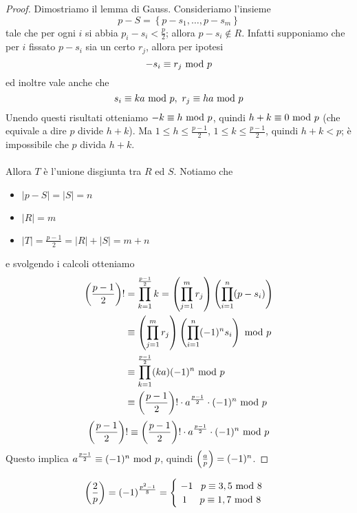 \begin{proof}
	Dimostriamo il lemma di Gauss. Consideriamo l'insieme
	\begin{equation*}
	p-S=\left\{p-s_1,\dots,p-s_m\right\}
	\end{equation*}
	tale che per ogni $i$ si abbia $p_i-s_i<\frac{p}{2}$; allora $p-s_i\notin R$. Infatti supponiamo che per $i$ fissato $p-s_i$ sia un certo $r_j$, allora per ipotesi
	\begin{equation*}
	-s_i\equiv r_j\ \mathrm{mod}\ p
	\end{equation*}
	ed inoltre vale anche che 
	\begin{equation*}
	s_i\equiv ka\ \mathrm{mod}\ p, \ r_j\equiv ha\ \mathrm{mod}\ p
	\end{equation*}
	Unendo questi risultati otteniamo $-k\equiv h\ \mathrm{mod}\ p$, quindi $h+k\equiv0\ \mathrm{mod}\ p$ (che equivale a dire $p$ divide $h+k$). Ma $1\leq h\leq\frac{p-1}{2}$, $1\leq k\leq\frac{p-1}{2}$, quindi $h+k<p$; è impossibile che $p$ divida $h+k$. \\ \\ 
	Allora $T$ è l'unione disgiunta tra $R$ ed $S$. Notiamo che 
	\begin{itemize}
		\item $|p-S|=|S|=n$
		\item $|R|=m$
		\item $|T|=\frac{p-1}{2}=|R|+|S|=m+n$
	\end{itemize}
	e svolgendo i calcoli otteniamo 
	\begin{align*}
	\left(\frac{p-1}{2}\right)!
	&=\prod_{k=1}^{\frac{p-1}{2}}k=\left(\prod_{j=1}^{m}r_j\right)\left(\prod_{i=1}^{n}(p-s_i)\right)\\
	&\equiv\left(\prod_{j=1}^{m}r_j\right)\left(\prod_{i=1}^{n}(-1)^ns_i\right)\ \mathrm{mod}\ p\\
	&\equiv\prod_{k=1}^{\frac{p-1}{2}}(ka)(-1)^n\ \mathrm{mod}\ p\\
	&\equiv\left(\frac{p-1}{2}\right)!\cdot a^{\frac{p-1}{2}}\cdot(-1)^n\ \mathrm{mod}\ p
	\end{align*}
	\begin{equation*}
	\left(\frac{p-1}{2}\right)!\equiv\left(\frac{p-1}{2}\right)!\cdot a^{\frac{p-1}{2}}\cdot(-1)^n\ \mathrm{mod}\ p
	\end{equation*}
	Questo implica $a^{\frac{p-1}{2}}\equiv(-1)^n\ \mathrm{mod}\ p$, quindi $\left(\frac{a}{p}\right)=(-1)^n$.
\end{proof}
\begin{corollario}
	\begin{equation*}
	\left(\frac{2}{p}\right)=(-1)^{\frac{p^2-1}{8}}=
	\begin{cases}
	\ -1 \ \ \,p\equiv3,5\ \mathrm{mod}\ 8\\
	\ \,1 \ \ \ \ p\equiv1,7\ \mathrm{mod}\ 8\\
	\end{cases}
	\end{equation*}
\end{corollario}
